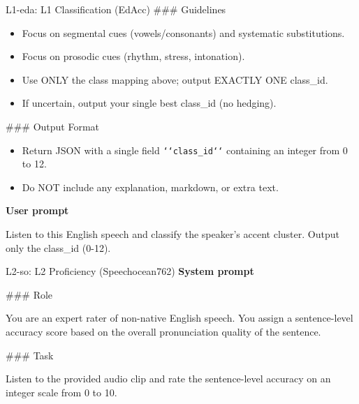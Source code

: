 {\begin{promptbox}{L1-eda: L1 Classification (EdAcc)}
\noindent\#\#\# Guidelines
\par
\begin{itemize}[leftmargin=*,noitemsep,topsep=2pt]
  \item Focus on segmental cues (vowels/consonants) and systematic substitutions.
  \item Focus on prosodic cues (rhythm, stress, intonation).
  \item Use ONLY the class mapping above; output EXACTLY ONE class\_id.
  \item If uncertain, output your single best class\_id (no hedging).
\end{itemize}

\noindent\#\#\# Output Format
\par
\begin{itemize}[leftmargin=*,noitemsep,topsep=2pt]
  \item Return JSON with a single field \texttt{\string`\string`class\_id\string`\string`} containing an integer from 0 to 12.
  \item Do NOT include any explanation, markdown, or extra text.
\end{itemize}

\par\vspace{2pt}
\textbf{User prompt}\par\vspace{2pt}
\noindent
Listen to this English speech and classify the speaker's accent cluster. Output only the class\_id (0-12).
\end{promptbox}

\par\vspace{4pt}
\begin{promptbox}{L2-so: L2 Proficiency (Speechocean762)}
\textbf{System prompt}\par\vspace{2pt}
\noindent\#\#\# Role
\par
You are an expert rater of non-native English speech. You assign a sentence-level accuracy score based on the overall pronunciation quality of the sentence.
\par\vspace{2pt}

\noindent\#\#\# Task
\par
Listen to the provided audio clip and rate the sentence-level accuracy on an integer scale from 0 to 10.
\par\vspace{2pt}


\end{promptbox}}
